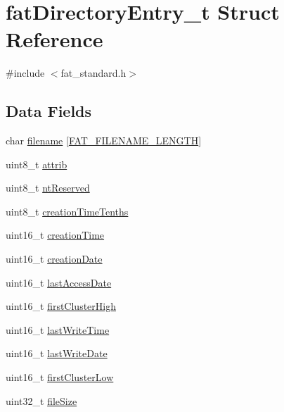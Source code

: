 \hypertarget{structfatDirectoryEntry__t}{\section{fat\+Directory\+Entry\+\_\+t Struct Reference}
\label{structfatDirectoryEntry__t}
}


{\ttfamily \#include $<$fat\+\_\+standard.\+h$>$}

\subsection*{Data Fields}
\begin{DoxyCompactItemize}
\item 
char \hyperlink{structfatDirectoryEntry__t_a3fa42bbc5761c2fc01626dbea5030619}{filename} \mbox{[}\hyperlink{fat__standard_8h_a9ff437da130628a5afeeefe5186522a9}{F\+A\+T\+\_\+\+F\+I\+L\+E\+N\+A\+M\+E\+\_\+\+L\+E\+N\+G\+T\+H}\mbox{]}
\item 
uint8\+\_\+t \hyperlink{structfatDirectoryEntry__t_a627470cf7773d753106d322c480805dd}{attrib}
\item 
uint8\+\_\+t \hyperlink{structfatDirectoryEntry__t_a07bf5f37360aa02419bc65e411754916}{nt\+Reserved}
\item 
uint8\+\_\+t \hyperlink{structfatDirectoryEntry__t_a29c9641394df2210b08bce786d6d5dba}{creation\+Time\+Tenths}
\item 
uint16\+\_\+t \hyperlink{structfatDirectoryEntry__t_a99a0d12a4e0652ee0f324bba590a37be}{creation\+Time}
\item 
uint16\+\_\+t \hyperlink{structfatDirectoryEntry__t_a46a38ded04baa1bd789f6b7039364aed}{creation\+Date}
\item 
uint16\+\_\+t \hyperlink{structfatDirectoryEntry__t_a3be85a0eeefcdbdc580b50bfd1bb3b3a}{last\+Access\+Date}
\item 
uint16\+\_\+t \hyperlink{structfatDirectoryEntry__t_ad75f69ae03df544898f9a3146b7b063e}{first\+Cluster\+High}
\item 
uint16\+\_\+t \hyperlink{structfatDirectoryEntry__t_a8deabe41bb3ec985fb82764d847a0f67}{last\+Write\+Time}
\item 
uint16\+\_\+t \hyperlink{structfatDirectoryEntry__t_a9e46083acccd6c1ebb27bd38f8a5607a}{last\+Write\+Date}
\item 
uint16\+\_\+t \hyperlink{structfatDirectoryEntry__t_a10d62b00d3b533b22d77e4077838dbcf}{first\+Cluster\+Low}
\item 
uint32\+\_\+t \hyperlink{structfatDirectoryEntry__t_aafa2b819301ef0b233d83282714635c9}{file\+Size}
\end{DoxyCompactItemize}


